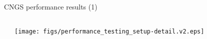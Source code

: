 \documentclass[compress,red]{beamer}
\begin{document}
\begin{frame}{CNGS performance results (1)}
\begin{columns}[c]
\begin{center}

	  \end{center}
		\begin{center}
		\texttt{[image: figs/performance\_testing\_setup-detail.v2.eps]}
		
		
		\end{center}
  \end{columns}


\end{frame}
\end{document}

